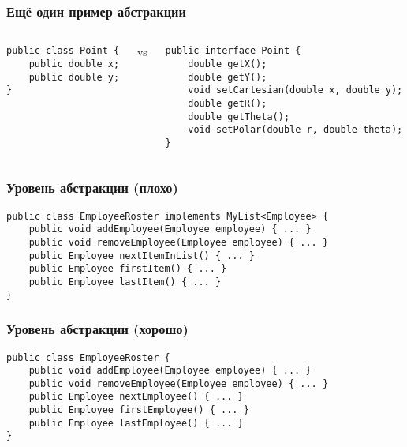 \documentclass{../../slides-style}
\begin{document}
    \begin{frame}[fragile]
        \frametitle{Ещё один пример абстракции}
        \begin{columns}
            \begin{column}{0.32\textwidth}
                \begin{verbatim}
public class Point {
    public double x;
    public double y;
}
                \end{verbatim}
            \end{column}
            \begin{column}{0.05\textwidth}
                vs
            \end{column}
            \begin{column}{0.6\textwidth}
                \begin{verbatim}
public interface Point {
    double getX();
    double getY();
    void setCartesian(double x, double y);
    double getR();
    double getTheta();
    void setPolar(double r, double theta);
}
                \end{verbatim}
            \end{column}
        \end{columns}
    \end{frame}

    \begin{frame}[fragile]
        \frametitle{Уровень абстракции (плохо)}
        \begin{verbatim}
public class EmployeeRoster implements MyList<Employee> {
    public void addEmployee(Employee employee) { ... }
    public void removeEmployee(Employee employee) { ... }
    public Employee nextItemInList() { ... }
    public Employee firstItem() { ... }
    public Employee lastItem() { ... }
}
        \end{verbatim}
    \end{frame}

    \begin{frame}[fragile]
        \frametitle{Уровень абстракции (хорошо)}
        \begin{verbatim}
public class EmployeeRoster {
    public void addEmployee(Employee employee) { ... }
    public void removeEmployee(Employee employee) { ... }
    public Employee nextEmployee() { ... }
    public Employee firstEmployee() { ... }
    public Employee lastEmployee() { ... }
}
        \end{verbatim}
    \end{frame}
\end{document}

